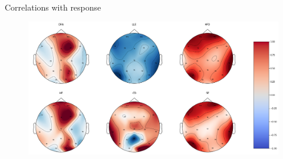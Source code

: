 \documentclass{beamer}
\begin{document}

\begin{frame}[noframenumbering]{Correlations with response}
  \centering
  \begin{figure}[tbp]
    \centering
    \includegraphics[width=\linewidth]{../Images/scalp_corr_change.png}
  \end{figure}
\end{frame}


\end{document}
